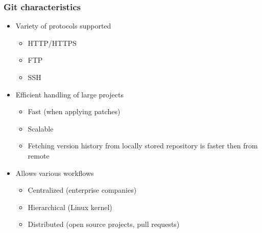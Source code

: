 \begin{frame}
\frametitle{Git characteristics}
\begin{itemize}
	\item Variety of protocols supported
		\begin{itemize}
		\item HTTP/HTTPS
		\item FTP
		\item SSH %
		\end{itemize}
	\item Efficient handling of large projects
		\begin{itemize}
		\item Fast (when applying patches)
		\item Scalable
		\item Fetching version history from locally stored repository is faster then from remote
		\end{itemize}%
	\item Allows various workflows
		\begin{itemize}
		\item Centralized (enterprise companies)
		\item Hierarchical (Linux kernel)
		\item Distributed (open source projects, pull requests)
		\end{itemize}%
\end{itemize}
\end{frame}

